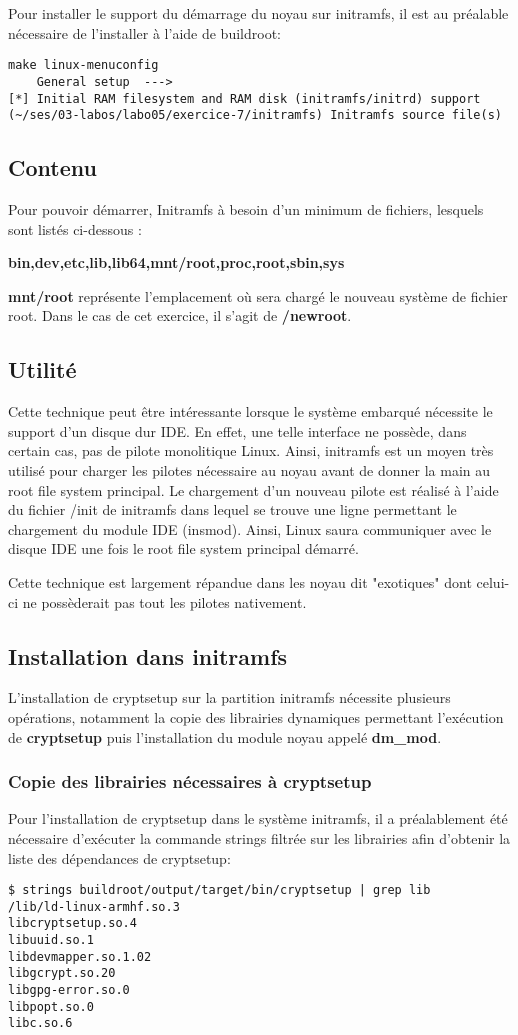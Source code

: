 Pour installer le support du démarrage du noyau sur initramfs, il est au préalable nécessaire de l'installer à l'aide de buildroot:
\begin{lstlisting}[style=Bash]
make linux-menuconfig
    General setup  --->
[*] Initial RAM filesystem and RAM disk (initramfs/initrd) support
(~/ses/03-labos/labo05/exercice-7/initramfs) Initramfs source file(s)
\end{lstlisting}

\subsection{Contenu}
Pour pouvoir démarrer, Initramfs à besoin d'un minimum de fichiers, lesquels sont listés ci-dessous :

\textbf{bin,dev,etc,lib,lib64,mnt/root,proc,root,sbin,sys}

\textbf{mnt/root} représente l'emplacement où sera chargé le nouveau système de fichier root. Dans le cas de cet exercice, il s'agit de \textbf{/newroot}.

\subsection{Utilité}
Cette technique peut être intéressante lorsque le système embarqué nécessite le support d'un disque dur IDE. En effet, une telle interface ne possède, dans certain cas, pas de pilote monolitique Linux. Ainsi, initramfs est un moyen très utilisé pour charger les pilotes nécessaire au noyau avant de donner la main au root file system principal. Le chargement d'un nouveau pilote est réalisé à l'aide du fichier /init de initramfs dans lequel se trouve une ligne permettant le chargement du module IDE (insmod). Ainsi, Linux saura communiquer avec le disque IDE une fois le root file system principal démarré.

Cette technique est largement répandue dans les noyau dit "exotiques" dont celui-ci ne possèderait pas tout les pilotes nativement.

\subsection{Installation dans initramfs}
L'installation de cryptsetup sur la partition initramfs nécessite plusieurs opérations, notamment la copie des librairies dynamiques permettant l'exécution de \textbf{cryptsetup} puis l'installation du module noyau appelé \textbf{dm\_mod}.

\subsubsection*{Copie des librairies nécessaires à cryptsetup}
Pour l'installation de cryptsetup dans le système initramfs, il a préalablement été nécessaire d'exécuter la commande strings filtrée sur les librairies afin d'obtenir la liste des dépendances de cryptsetup:
\begin{lstlisting}[style=Bash]
$ strings buildroot/output/target/bin/cryptsetup | grep lib
/lib/ld-linux-armhf.so.3
libcryptsetup.so.4
libuuid.so.1
libdevmapper.so.1.02
libgcrypt.so.20
libgpg-error.so.0
libpopt.so.0
libc.so.6
\end{lstlisting}

